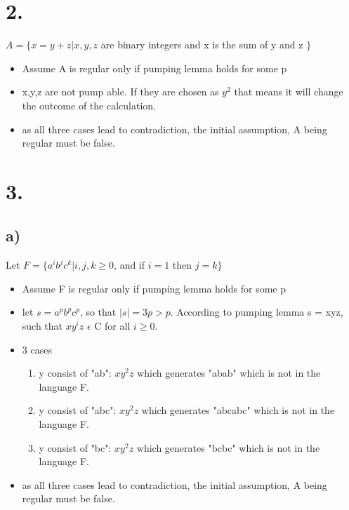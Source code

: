 \documentclass[]{article}
\begin{document}
\section*{2.}

$A = \{x = y + z | x,y,z$ are binary integers and x is the sum of y and z $\}$ \\
\begin{itemize}
	\item Assume A is regular only if pumping lemma holds for some p	
	\item x,y,z are not pump able. If they are chosen as $y^{2}$ that means it will change the outcome of the calculation.
	\item as all three cases lead to contradiction, the initial assumption, A being regular must be false.
\end{itemize}
\section*{3.}

\subsection*{a)}

Let $F = \{a^{i}b^{j}c^{k} | i,j,k \ge 0$, and if $i = 1$ then $j = k\}$

\begin{itemize}
	\item Assume F is regular only if pumping lemma holds for some p
	\item let $s = a^{p}b^{p}c^{p}$, so that $|s| = 3p > p$. According to pumping lemma s = xyz, such that $xy^{i}z$ $\epsilon$ C for all $i \ge 0$.
	\item 3 cases
	\begin{enumerate}
		\item y consist of "ab": $xy^{2}z$ which generates "abab" which is not in the language F.
		\item y consist of "abc": $xy^{2}z$ which generates "abcabc" which is not in the language F.
		\item y consist of "bc": $xy^{2}z$ which generates "bcbc" which is not in the language F.
	\end{enumerate}
	\item as all three cases lead to contradiction, the initial assumption, A being regular must be false.
\end{itemize}

\pagebreak
\end{document}
